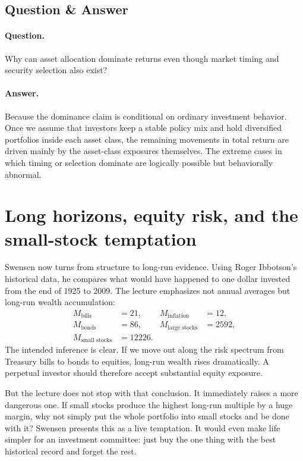 \subsection{Question \& Answer}

\paragraph{Question.} Why can asset allocation dominate returns even though market timing and security selection also exist?

\paragraph{Answer.} Because the dominance claim is conditional on ordinary investment behavior. Once we assume that investors keep a stable policy mix and hold diversified portfolios inside each asset class, the remaining movements in total return are driven mainly by the asset-class exposures themselves. The extreme cases in which timing or selection dominate are logically possible but behaviorally abnormal.

\section{Long horizons, equity risk, and the small-stock temptation}

Swensen now turns from structure to long-run evidence. Using Roger Ibbotson's historical data, he compares what would have happened to one dollar invested from the end of 1925 to 2009. The lecture emphasizes not annual averages but long-run wealth accumulation:
\begin{align}
M_{\text{bills}} &= 21, &
M_{\text{inflation}} &= 12,\\
M_{\text{bonds}} &= 86, &
M_{\text{large stocks}} &= 2592,\\
M_{\text{small stocks}} &= 12226. &&
\end{align}
The intended inference is clear. If we move out along the risk spectrum from Treasury bills to bonds to equities, long-run wealth rises dramatically. A perpetual investor should therefore accept substantial equity exposure.

But the lecture does not stop with that conclusion. It immediately raises a more dangerous one. If small stocks produce the highest long-run multiple by a huge margin, why not simply put the whole portfolio into small stocks and be done with it? Swensen presents this as a live temptation. It would even make life simpler for an investment committee: just buy the one thing with the best historical record and forget the rest.

